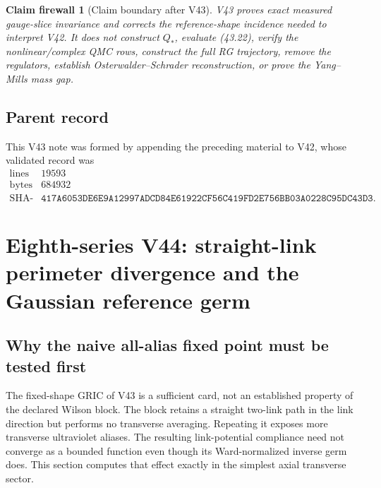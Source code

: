 \documentclass[11pt,oneside]{book}
\newtheorem{firewall}[theorem]{Claim firewall}
\theoremstyle{definition}
\theoremstyle{remark}
\begin{document}
\begin{firewall}[Claim boundary after V43]
\label{fire:e8v43-claim}
V43 proves exact measured gauge-slice invariance and corrects the
reference-shape incidence needed to interpret V42.  It does not
construct \(Q_*\), evaluate (43.22), verify the nonlinear/complex
QMC rows, construct the full RG trajectory, remove the regulators,
establish Osterwalder--Schrader reconstruction, or prove the
Yang--Mills mass gap.
\end{firewall}

\subsection{Parent record}

This V43 note was formed by appending the preceding material to V42,
whose validated record was
\[
\begin{array}{c|c}
\text{lines}&19593\\
\text{bytes}&684932\\
\text{SHA-256}&
\texttt{417A6053DE6E9A12997ADCD84E61922CF56C419FD2E756BB03A0228C95DC43D3}.
\end{array}
\]



\section{Eighth-series V44: straight-link perimeter divergence and the
Gaussian reference germ}
\label{sec:e8v44}

\subsection{Why the naive all-alias fixed point must be tested first}

The fixed-shape GRIC of V43 is a sufficient card, not an established
property of the declared Wilson block.  The block retains a straight
two-link path in the link direction but performs no transverse
averaging.  Repeating it exposes more transverse ultraviolet aliases.
The resulting link-potential compliance need not converge as a
bounded function even though its Ward-normalized inverse germ does.
This section computes that effect exactly in the simplest axial
transverse sector.
\end{document}
